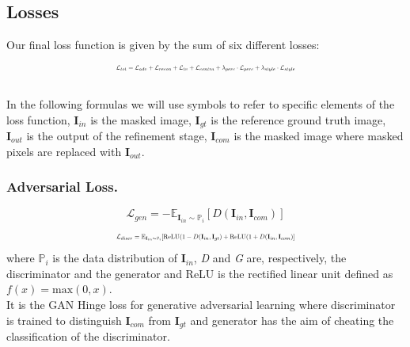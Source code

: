 \documentclass[10pt,twocolumn,letterpaper]{article}
\begin{document}
\subsection{Losses}
Our final loss function is given by the sum of six different losses:
\begin{equation}
    \resizebox{.47 \textwidth}{!}{%
    $\mathcal{L}_{tot} = \mathcal{L}_{adv} + \mathcal{L}_{recon} + \mathcal{L}_{tv} + \mathcal{L}_{contra} + \lambda_{perc} \cdot \mathcal{L}_{perc} + \lambda_{style} \cdot \mathcal{L}_{style}$%
    }
\end{equation}
\\
In the following formulas we will use symbols to refer to specific elements of the loss function, $\mathbf{I}_{in}$ is the masked image, $\mathbf{I}_{gt}$ is the reference ground truth image, $\mathbf{I}_{out}$ is the output of the refinement stage, $\mathbf{I}_{com}$ is the masked image where masked pixels are replaced with $\mathbf{I}_{out}$.
\\
\subsubsection{Adversarial Loss.}
\begin{equation}
    \mathcal{L}_{gen} = -\mathbb{E}_{\mathbf{I}_{in} \sim \mathbb{P}_i} [D(\mathbf{I}_{in},\mathbf{I}_{com})]
\end{equation}
\begin{equation}
    \resizebox{.47 \textwidth}{!}{%
    $\mathcal{L}_{discr} = \mathbb{E}_{\mathbf{I}_{in} \sim \mathbb{P}_i} [\mathrm{ReLU}(1-D(\mathbf{I}_{in},\mathbf{I}_{gt}) + \mathrm{ReLU}(1+D(\mathbf{I}_{in},\mathbf{I}_{com})]$%
    }
\end{equation}
where \(\mathbb{P}_i\) is the data distribution of $\mathbf{I}_{in}$, \textit{D} and \textit{G} are, respectively, the discriminator and the generator and ReLU is the rectified linear unit defined as \(f(x) = \mathrm{max}(0,x)\).\\
It is the GAN Hinge loss for generative adversarial learning where discriminator is trained to distinguish $\mathbf{I}_{com}$ from $\mathbf{I}_{gt}$ and generator has the aim of cheating the classification of the discriminator.
\end{document}

